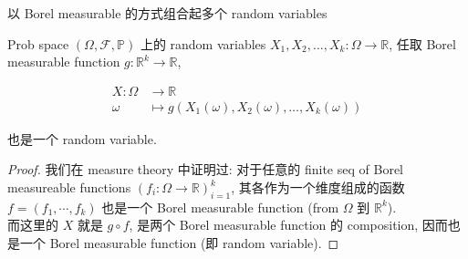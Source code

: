 \documentclass{qlnotes-export}
\begin{document}
\begin{proposition}{以 Borel measurable 的方式组合起多个 random variables}\label{prop-02-random-variables-borel-measurable-random-variables}

Prob space \((\Omega,\mathcal{F},{\mathbb{P}})\) 上的 random variables \(X_{1},X_{2},\ldots,X_{k}:\Omega\rightarrow{\mathbb{R}}\), 任取 Borel measurable function \(g:{\mathbb{R}}^{k}\rightarrow{\mathbb{R}}\),

\[\begin{matrix}
{X:\Omega} & {\rightarrow{\mathbb{R}}} \\
\omega & {\mapsto g(X_{1}(\omega),X_{2}(\omega),\ldots,X_{k}(\omega))}
\end{matrix}\]

也是一个 random variable.

\end{proposition}

\begin{proof}

我们在 measure theory 中证明过: 对于任意的 finite seq of Borel measureable functions \((f_{i}:\Omega\rightarrow{\mathbb{R}})_{i = 1}^{k}\), 其各作为一个维度组成的函数 \(f = (f_{1},\cdots,f_{k})\) 也是一个 Borel measurable function (from \(\Omega\) 到 \({\mathbb{R}}^{k}\)).\\
而这里的 \(X\) 就是 \(g \circ f\), 是两个 Borel measurable function 的 composition, 因而也是一个 Borel measurable function (即 random variable).

\end{proof}
\end{document}
